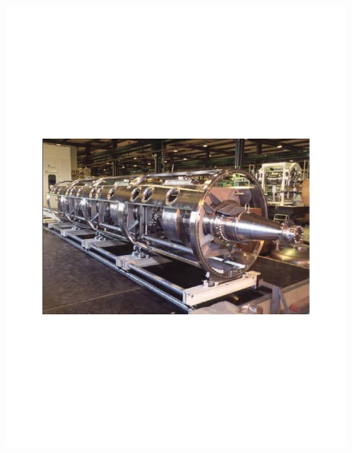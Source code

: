 \documentclass[
	11pt, %
]{beamer}
\begin{document}
\begin{frame}
\begin{figure}
	\vspace*{-4.5cm}
	 \hspace*{7cm}
	\includegraphics[scale=.2]{rf_cavity_act.pdf}
\end{figure}


\end{frame}
\end{document}
